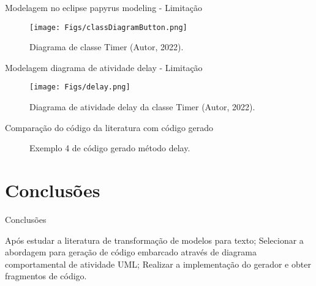 \documentclass[handout,aspectratio = 169]{beamer}
\begin{document}
\begin{frame}{Modelagem no eclipse papyrus modeling - Limitação}
    \begin{figure}
            \centering
             \texttt{[image: Figs/classDiagramButton.png]}
            \caption{Diagrama de classe Timer (Autor, 2022).}
        \end{figure}
\end{frame}

\begin{frame}{Modelagem diagrama de atividade delay - Limitação}
    \begin{figure}
            \centering
             \texttt{[image: Figs/delay.png]}
            \caption{Diagrama de atividade delay da classe Timer (Autor, 2022).}
        \end{figure}
\end{frame}

\begin{frame}{Comparação do código da literatura com código gerado}

\begin{figure}[htbp]
\centering
{} %
\quad %
\caption{Exemplo 4 de código gerado método delay.}
\end{figure}

\end{frame}


\section{Conclusões}

\begin{frame}{Conclusões}
    \begin{outline}
        \1 Após estudar a literatura de transformação de modelos para texto;
        \1 Selecionar a abordagem para geração de código embarcado através de diagrama comportamental de atividade UML; 
        \1 Realizar a implementação do gerador e obter fragmentos de código.
    \end{outline}
\end{frame}
\end{document}
